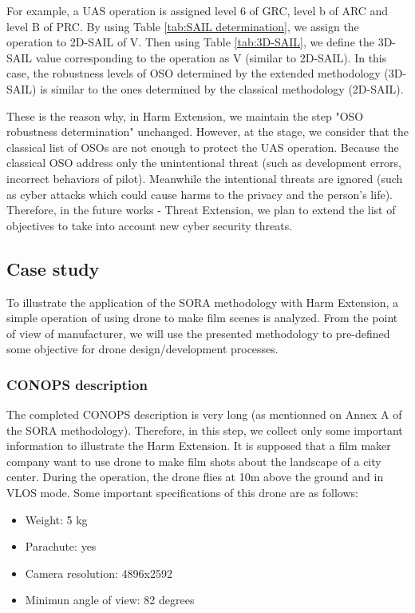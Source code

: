 \documentclass[a4paper, 10, conference]{ieeeconf}  %
\begin{document}
For example, a UAS operation is assigned level 6 of GRC, level b of ARC and level B of PRC. By using Table \ref{tab:SAIL determination}, we assign the operation to 2D-SAIL of V. Then using Table \ref{tab:3D-SAIL}, we define the 3D-SAIL value corresponding to the operation as V (similar to 2D-SAIL). In this case, the robustness levels of OSO determined by the extended methodology (3D-SAIL) is similar to the ones determined by the classical methodology (2D-SAIL). 

These is the reason why, in Harm Extension, we maintain the step "OSO robustness determination" unchanged. However, at the stage, we consider that the classical list of OSOs are not enough to protect the UAS operation. Because the classical OSO address only the unintentional threat (such as development errors, incorrect behaviors of pilot). Meanwhile the intentional threats are ignored (such as cyber attacks which could cause harms to the privacy and the person's life). Therefore, in the future works - Threat Extension, we plan to extend the list of objectives to take into account new cyber security threats.

\subsection{Case study} \label{sec:cas}

To illustrate the application of the SORA methodology with Harm Extension, a simple operation of using drone to make film scenes is analyzed. From the point of view of manufacturer, we will use the presented methodology to pre-defined some objective for drone design/development processes.

\subsubsection{CONOPS description}
The completed CONOPS description is very long (as mentionned on Annex A of the SORA methodology). Therefore, in this step, we collect only some important information to illustrate the Harm Extension. It is supposed that a film maker company want to use drone to make film shots about the landscape of a city center. During the operation, the drone flies at 10m above the ground and in VLOS mode. Some important specifications of this drone are as follows:
\begin{itemize}
    \item Weight: 5 kg
    \item Parachute: yes
    \item Camera resolution: 4896x2592
    \item Minimun angle of view: 82 degrees 
\end{itemize}
\end{document}
